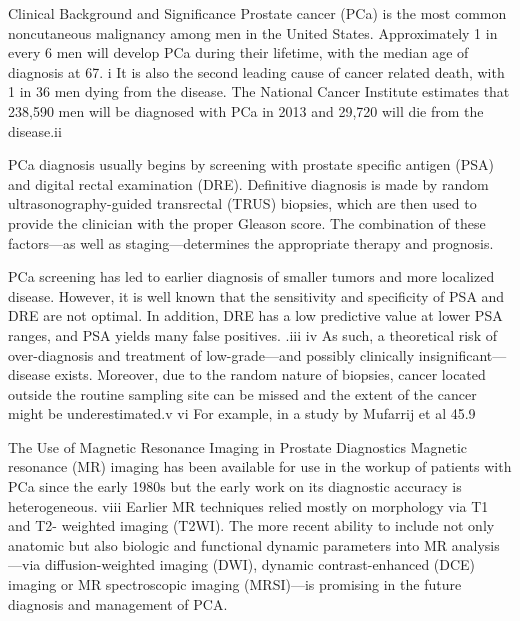 Clinical Background and Significance 
Prostate cancer (PCa) is the most common noncutaneous malignancy among men in the United States. Approximately 1 in every 6 men will develop PCa during their lifetime, with the median age of diagnosis at 67. i It is also the second leading cause of cancer related death, with 1 in 36 men dying from the disease. The National Cancer Institute estimates that 238,590 men will be diagnosed with PCa in 2013 and 29,720 will die from the disease.ii

PCa diagnosis usually begins by screening with prostate specific antigen (PSA) and digital rectal examination (DRE).  Definitive diagnosis is made by random ultrasonography-guided transrectal (TRUS) biopsies, which are then used to provide the clinician with the proper Gleason score. The combination of these factors—as well as staging—determines the appropriate therapy and prognosis. 

PCa screening has led to earlier diagnosis of smaller tumors and more localized disease.  However, it is well known that the sensitivity and specificity of PSA and DRE are not optimal. In addition, DRE has a low predictive value at lower PSA ranges, and PSA yields many false positives. .iii iv  As such, a theoretical risk of over-diagnosis and treatment of low-grade—and possibly clinically insignificant—disease exists. Moreover, due to the random nature of biopsies, cancer located outside the routine sampling site can be missed and the extent of the cancer might be underestimated.v vi For example, in a study by Mufarrij et al 45.9%

The Use of Magnetic Resonance Imaging in Prostate Diagnostics
Magnetic resonance (MR) imaging has been available for use in the workup of patients with PCa since the early 1980s but the early work on its diagnostic accuracy is heterogeneous. viii Earlier MR techniques relied mostly on morphology via T1 and T2- weighted imaging (T2WI). The more recent ability to include not only anatomic but also biologic and functional dynamic parameters into MR analysis—via diffusion-weighted imaging (DWI), dynamic contrast-enhanced (DCE) imaging or MR spectroscopic imaging (MRSI)—is promising in the future diagnosis and management of PCA.

